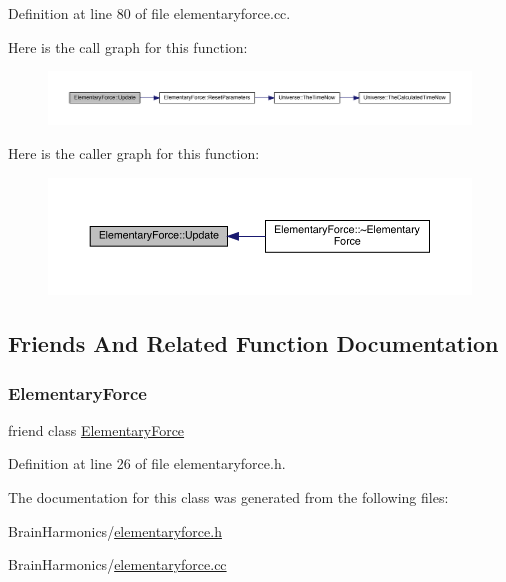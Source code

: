 Definition at line 80 of file elementaryforce.\+cc.

Here is the call graph for this function\+:
\nopagebreak
\begin{figure}[H]
\begin{center}
\leavevmode
\includegraphics[width=350pt]{class_elementary_force_a855c26eb8a542ff633af66940da5f90b_cgraph}
\end{center}
\end{figure}
Here is the caller graph for this function\+:
\nopagebreak
\begin{figure}[H]
\begin{center}
\leavevmode
\includegraphics[width=350pt]{class_elementary_force_a855c26eb8a542ff633af66940da5f90b_icgraph}
\end{center}
\end{figure}


\subsection{Friends And Related Function Documentation}
\mbox{\label{class_elementary_force_a6e57500586e9cd366f5cf76ea0299957}} 
\subsubsection{\texorpdfstring{Elementary\+Force}{ElementaryForce}}
{\footnotesize\ttfamily friend class \hyperlink{class_elementary_force}{Elementary\+Force}\hspace{0.3cm}{\ttfamily [friend]}}



Definition at line 26 of file elementaryforce.\+h.



The documentation for this class was generated from the following files\+:\begin{DoxyCompactItemize}
\item 
Brain\+Harmonics/\hyperlink{elementaryforce_8h}{elementaryforce.\+h}\item 
Brain\+Harmonics/\hyperlink{elementaryforce_8cc}{elementaryforce.\+cc}\end{DoxyCompactItemize}

